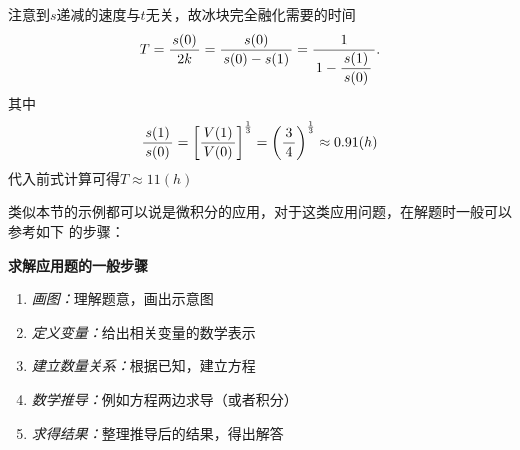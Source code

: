 注意到$s$递减的速度与$t$无关，故冰块完全融化需要的时间
$$T=\displaystyle\frac{\,{s(0)}\,}{\,{2k}\,}=\displaystyle\frac{\,{s(0)}\,}{\,{s(0)-s(1)}\,}=\displaystyle\frac{\,{1}\,}{\,{1-\displaystyle\frac{\,{s(1)}\,}{\,{s(0)}\,}}\,}.$$
其中
$$\displaystyle\frac{\,{s(1)}\,}{\,{s(0)}\,}=\left[\displaystyle\frac{\,{V(1)}\,}{\,{V(0)}\,}\right]^{\frac13}=
\left(\displaystyle\frac{\,{3}\,}{\,{4}\,}\right)^{\frac13}\approx0.91(h)$$
代入前式计算可得$T\approx11(h)$

类似本节的示例都可以说是微积分的应用，对于这类应用问题，在解题时一般可以参考如下
的步骤：
\begin{thx}
	{\bf 求解应用题的一般步骤}
	\begin{enumerate}
	  \item {{\it 画图：}}理解题意，画出示意图
	  \item {{\it 定义变量：}}给出相关变量的数学表示
	  \item {{\it 建立数量关系：}}根据已知，建立方程
	  \item {{\it 数学推导：}}例如方程两边求导（或者积分）
	  \item {{\it 求得结果：}}整理推导后的结果，得出解答
	\end{enumerate}
\end{thx}

